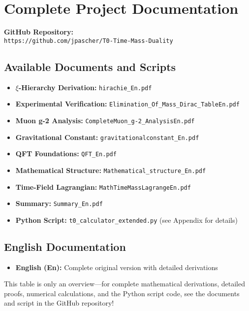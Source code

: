 \documentclass[12pt,a4paper]{article}
\begin{document}
	\section{Complete Project Documentation}
	
	\textbf{GitHub Repository:}\\
	\texttt{https://github.com/jpascher/T0-Time-Mass-Duality}
	
	\subsection{Available Documents and Scripts}
	
	\begin{itemize}
		\item \textbf{\(\xi\)-Hierarchy Derivation:} \texttt{hirachie\_En.pdf}
		\item \textbf{Experimental Verification:} \texttt{Elimination\_Of\_Mass\_Dirac\_TableEn.pdf}
		\item \textbf{Muon g-2 Analysis:} \texttt{CompleteMuon\_g-2\_AnalysisEn.pdf}
		\item \textbf{Gravitational Constant:} \texttt{gravitationalconstant\_En.pdf}
		\item \textbf{QFT Foundations:} \texttt{QFT\_En.pdf}
		\item \textbf{Mathematical Structure:} \texttt{Mathematical\_structure\_En.pdf}
		\item \textbf{Time-Field Lagrangian:} \texttt{MathTimeMassLagrangeEn.pdf}
		\item \textbf{Summary:} \texttt{Summary\_En.pdf}
		\item \textbf{Python Script:} \texttt{t0\_calculator\_extended.py} (see Appendix for details)
	\end{itemize}
	
	\subsection{English Documentation}
	
	\begin{itemize}
		\item \textbf{English (En):} Complete original version with detailed derivations
	\end{itemize}
	
	This table is only an overview—for complete mathematical derivations, detailed proofs, numerical calculations, and the Python script code, see the documents and script in the GitHub repository!
	
\end{document}
